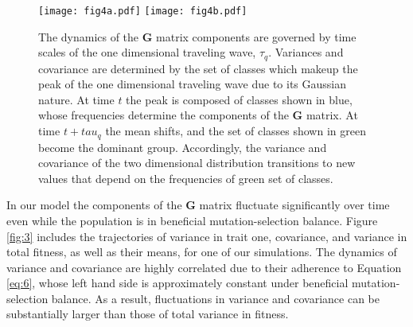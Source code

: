 \documentclass[11pt,twocolumn]{article}
\newcommand{\G}{\textbf{G }}
\begin{document}
\begin{figure}[h!]
\texttt{[image: fig4a.pdf]}
\texttt{[image: fig4b.pdf]}
\caption{\footnotesize The dynamics of the \G  matrix components are governed by time scales of the one dimensional traveling wave, $\tau_q$. Variances and covariance are determined by the set of classes which makeup the peak of the one dimensional traveling wave due to its Gaussian nature. At time $t$ the peak is composed of classes shown in blue, whose frequencies determine the components of the \G  matrix. At time $t+tau_q$ the mean shifts, and the set of classes shown in green become the dominant group. Accordingly, the variance and covariance of the two dimensional distribution transitions to new values that depend on the frequencies of green set of classes.}\label{fig:4}
\end{figure}

In our model the components of the \G matrix fluctuate significantly over time even while the population is in beneficial mutation-selection balance. Figure \ref{fig:3} includes the trajectories of variance in trait one, covariance, and variance in total fitness, as well as their means, for one of our simulations. The dynamics of variance and covariance are highly correlated due to their adherence to Equation \eqref{eq:6}, whose left hand side is approximately constant under beneficial mutation-selection balance. As a result, fluctuations in variance and covariance can be substantially larger than those of total variance in fitness.\par
\end{document}
